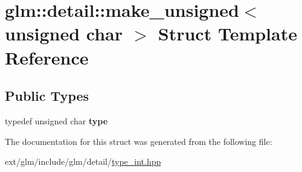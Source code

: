 \hypertarget{structglm_1_1detail_1_1make__unsigned_3_01unsigned_01char_01_4}{\section{glm\-:\-:detail\-:\-:make\-\_\-unsigned$<$ unsigned char $>$ Struct Template Reference}
\label{structglm_1_1detail_1_1make__unsigned_3_01unsigned_01char_01_4}
}
\subsection*{Public Types}
\begin{DoxyCompactItemize}
\item 
\hypertarget{structglm_1_1detail_1_1make__unsigned_3_01unsigned_01char_01_4_a783a55dc0559d4b972a0d85cf08256f2}{typedef unsigned char {\bfseries type}}\label{structglm_1_1detail_1_1make__unsigned_3_01unsigned_01char_01_4_a783a55dc0559d4b972a0d85cf08256f2}

\end{DoxyCompactItemize}


The documentation for this struct was generated from the following file\-:\begin{DoxyCompactItemize}
\item 
ext/glm/include/glm/detail/\hyperlink{type__int_8hpp}{type\-\_\-int.\-hpp}\end{DoxyCompactItemize}
